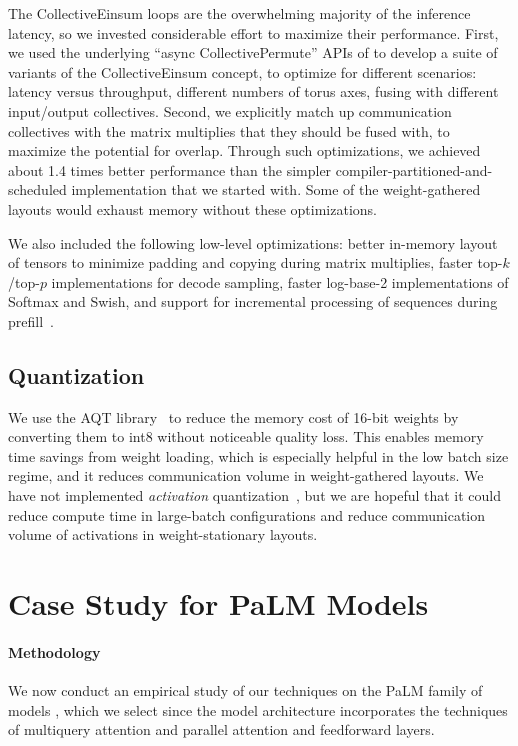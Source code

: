 The CollectiveEinsum loops are the overwhelming majority of the inference latency, so we invested considerable effort to maximize their performance. First, we used the underlying ``async CollectivePermute'' APIs of \citet{wang2023collectivematmul} to develop a suite of variants of the CollectiveEinsum concept, to optimize for different scenarios: latency versus throughput, different numbers of torus axes, fusing with different input/output collectives. Second, we explicitly match up communication collectives with the matrix multiplies that they should be fused with, to maximize the potential for overlap. Through such optimizations, we achieved about 1.4 times better performance than the simpler compiler-partitioned-and-scheduled implementation that we started with. Some of the weight-gathered layouts would exhaust memory without these optimizations.

We also included the following low-level optimizations: better in-memory layout of tensors to minimize padding and copying during matrix multiplies, faster top-$k$/top-$p$ implementations for decode sampling, faster log-base-2 implementations of Softmax and Swish, and support for incremental processing of sequences during prefill~\cite{fastertransformer}.

\subsection{Quantization}
\label{sec:incrementality}
We use the AQT library~\cite{aqt2022github} to reduce the memory cost of 16-bit weights by converting them to int8 without noticeable quality loss. This enables memory time savings from weight loading, which is especially helpful in the low batch size regime, and it reduces communication volume in weight-gathered layouts. We have not implemented \emph{activation} quantization~\cite{abdolrashidi2021pareto}, but we are hopeful that it could reduce compute time in large-batch configurations and reduce communication volume of activations in weight-stationary layouts.

\section{Case Study for PaLM Models}\label{sec:evals}
\paragraph{Methodology} We now conduct an empirical study of our techniques on the PaLM family of models \cite{chowdhery2022palm}, which we select since the model architecture incorporates the techniques of multiquery attention and parallel attention and feedforward layers.


